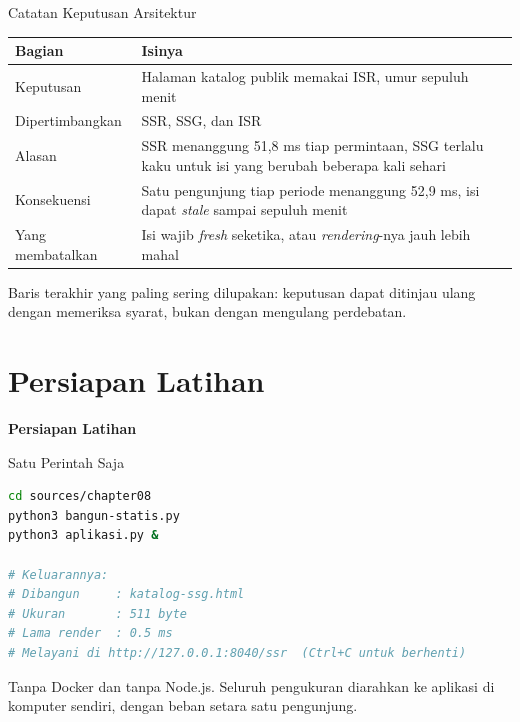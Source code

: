 \documentclass[aspectratio=169, table, 12pt]{beamer}
\begin{document}
\begin{frame}{{\Large Catatan Keputusan Arsitektur}}
  \vspace{6pt}
  \centering
  {\footnotesize
  \begin{tabularx}{\textwidth}{lY}
    \hline
    \textbf{Bagian} & \textbf{Isinya} \\
    \hline
    Keputusan & Halaman katalog publik memakai ISR, umur sepuluh menit \\
    \hline
    Dipertimbangkan & SSR, SSG, dan ISR \\
    \hline
    Alasan & SSR menanggung 51,8 ms tiap permintaan, SSG terlalu kaku untuk isi yang berubah beberapa kali sehari \\
    \hline
    Konsekuensi & Satu pengunjung tiap periode menanggung 52,9 ms, isi dapat \textit{stale} sampai sepuluh menit \\
    \hline
    Yang membatalkan & Isi wajib \textit{fresh} seketika, atau \textit{rendering}-nya jauh lebih mahal \\
    \hline
  \end{tabularx}}

  \vspace{6pt}
  {\footnotesize Baris terakhir yang paling sering dilupakan: keputusan dapat
  ditinjau ulang dengan memeriksa syarat, bukan dengan mengulang perdebatan.}
\end{frame}

\section{Persiapan Latihan}

\begin{frame}{\hfill}
  \centering
  \Huge{\textbf{Persiapan Latihan}}
\end{frame}

\begin{frame}[fragile]{{\Large Satu Perintah Saja}}
  \vspace{2pt}
\begin{lstlisting}[language=bash]
cd sources/chapter08
python3 bangun-statis.py
python3 aplikasi.py &

# Keluarannya:
# Dibangun     : katalog-ssg.html
# Ukuran       : 511 byte
# Lama render  : 0.5 ms
# Melayani di http://127.0.0.1:8040/ssr  (Ctrl+C untuk berhenti)
\end{lstlisting}
  \vspace{2pt}
  {\small Tanpa Docker dan tanpa Node.js. Seluruh pengukuran diarahkan ke
  aplikasi di komputer sendiri, dengan beban setara satu pengunjung.}
\end{frame}
\end{document}
